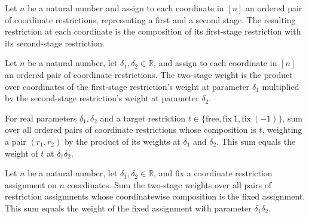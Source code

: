 \begin{definition}
\label{FABL.twoStageCoordRestriction}
\leanok
{}
Let $n$ be a natural number and assign to each coordinate in $[n]$ an ordered pair of
coordinate restrictions, representing a first and a second stage. The resulting
restriction at each coordinate is the composition of its first-stage restriction with
its second-stage restriction.
\end{definition}

\begin{definition}
\label{FABL.twoStageCoordRestrictionWeight}
\leanok
{}
Let $n$ be a natural number, let $\delta_1,\delta_2\in\mathbb{R}$, and assign to each
coordinate in $[n]$ an ordered pair of coordinate restrictions. The two-stage weight is
the product over coordinates of the first-stage restriction's weight at parameter
$\delta_1$ multiplied by the second-stage restriction's weight at parameter $\delta_2$.
\end{definition}

\begin{theorem}
\label{FABL.sum_twoStageCoordRestrictionWeight_localFiber}
\leanok
{}
For real parameters $\delta_1,\delta_2$ and a target restriction
$t\in\{\mathrm{free},\mathrm{fix\ }1,\mathrm{fix\ }(-1)\}$, sum over all ordered pairs
of coordinate restrictions whose composition is $t$, weighting a pair $(r_1,r_2)$ by the
product of its weights at $\delta_1$ and $\delta_2$. This sum equals the weight of $t$
at $\delta_1\delta_2$.
\end{theorem}

\begin{theorem}
\label{FABL.sum_twoStageCoordRestrictionWeight_fiber}
\leanok
{}
Let $n$ be a natural number, let $\delta_1,\delta_2\in\mathbb R$, and fix a
coordinate restriction assignment on $n$ coordinates. Sum the two-stage weights over all
pairs of restriction assignments whose coordinatewise composition is the fixed
assignment. This sum equals the weight of the fixed assignment with parameter
$\delta_1\delta_2$.
\end{theorem}

